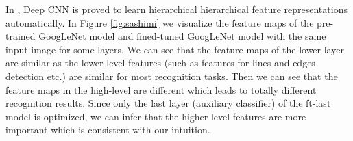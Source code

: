 In \cite{farabet2013learning}, Deep CNN is proved to learn hierarchical hierarchical feature representations automatically.
In Figure \ref{fig:sashimi} we visualize the feature maps of the pre-trained GoogLeNet model and fined-tuned GoogLeNet model with the same input image for some layers. We can see that the feature maps of the lower layer are similar as the lower level features (such as features for lines and edges detection etc.) are similar for most recognition tasks.
Then we can see that the feature maps in the high-level are different which leads to totally different recognition results.
Since only the last layer (auxiliary classifier) of the ft-last model is optimized, we can infer that the higher level features are more important which is consistent with our intuition. %

